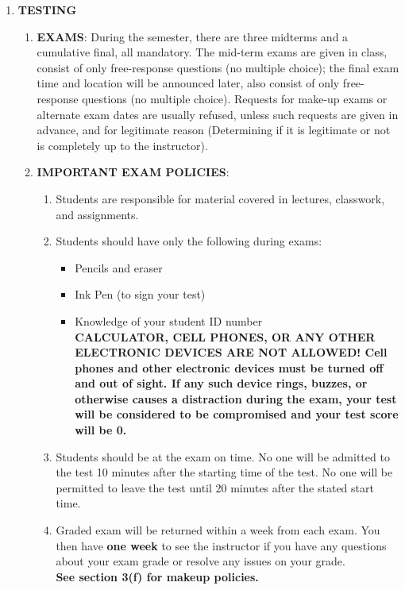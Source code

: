 \documentclass[12pt]{amsart}
\begin{document}
\begin {enumerate}
\item {\bf TESTING}\\
\begin {enumerate}
\item {\bf EXAMS}: During the semester, there are three midterms and a cumulative final, all mandatory. The mid-term exams are given in class, consist of only free-response questions (no multiple choice); the final exam time and location will be announced later, also consist of only free-response questions (no multiple choice). Requests for make-up exams or alternate exam dates are usually refused, unless such requests are given in advance, and for legitimate reason (Determining if it is legitimate or not is completely up to the instructor). \\
\item {\bf IMPORTANT EXAM POLICIES}: 
\begin {enumerate}
\item Students are responsible for material covered in lectures, classwork, and assignments. 
\item Students should have only the following during exams:
\begin {itemize}
\item Pencils and eraser
\item Ink Pen (to sign your test)
\item Knowledge of your student ID number\\

{\bf  CALCULATOR, CELL PHONES, OR ANY OTHER ELECTRONIC DEVICES ARE NOT ALLOWED! Cell phones and other electronic devices must be turned off and out of sight. If any such device rings, buzzes, or otherwise causes a distraction during the exam, your test will be considered to be compromised and your test score will be 0.}
\end {itemize}
\item Students should be at the exam on time. No one will be admitted to the test 10 minutes after the starting time of the test. No one will be permitted to leave the test until 20 minutes after the stated start time.
\item Graded exam will be returned within a week from each exam. You then have {\bf one week} to see the instructor if you have any questions about your exam grade or resolve any issues on your grade.\\

{\bf See section 3(f) for makeup policies.}\\
\end {enumerate}
\end {enumerate}



\end{enumerate}
\end{document}
